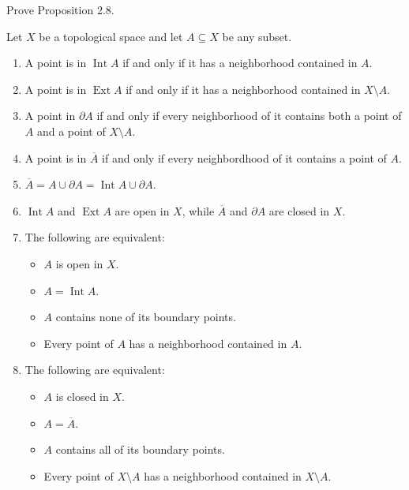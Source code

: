 \begin{exercise}{2.9}\label{exercise:2.9}
	Prove Proposition 2.8.

	Let $X$ be a topological space and let $A\subseteq X$ be any subset.

	\begin{enumerate}[label={(\alph*)}]
		\item A point is in $\operatorname{Int} A$ if and only if it has a neighborhood contained in $A$.
		\item A point is in $\operatorname{Ext} A$ if and only if it has a neighborhood contained in $X\setminus A$.
		\item A point in $\partial A$ if and only if every neighborhood of it contains both a point of $A$ and a point of $X\setminus A$.
		\item A point is in $\overline{A}$ if and only if every neighbordhood of it contains a point of $A$.
		\item $\overline{A} = A\cup \partial A = \operatorname{Int} A\cup \partial A$.
		\item $\operatorname{Int} A$ and $\operatorname{Ext}A$ are open in $X$, while $\overline{A}$ and $\partial A$ are closed in $X$.
		\item The following are equivalent:
		      \begin{itemize}
			      \item $A$ is open in $X$.
			      \item $A = \operatorname{Int} A$.
			      \item $A$ contains none of its boundary points.
			      \item Every point of $A$ has a neighborhood contained in $A$.
		      \end{itemize}
		\item The following are equivalent:
		      \begin{itemize}
			      \item $A$ is closed in $X$.
			      \item $A = \overline{A}$.
			      \item $A$ contains all of its boundary points.
			      \item Every point of $X\setminus A$ has a neighborhood contained in $X\setminus A$.
		      \end{itemize}
	\end{enumerate}
\end{exercise}

